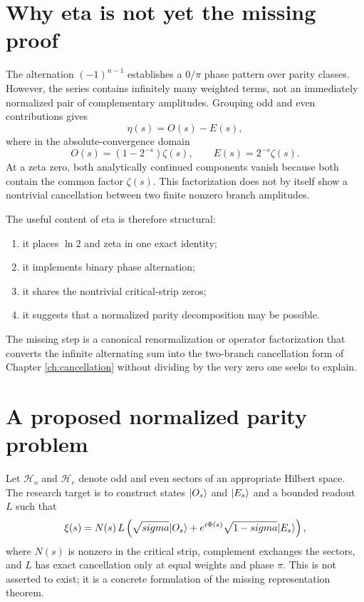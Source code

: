 \section{Why eta is not yet the missing proof}
The alternation $(-1)^{n-1}$ establishes a $0/\pi$ phase pattern over parity classes. However, the series contains infinitely many weighted terms, not an immediately normalized pair of complementary amplitudes. Grouping odd and even contributions gives
\begin{equation}
\eta(s)=O(s)-E(s),
\end{equation}
where in the absolute-convergence domain
\begin{equation}
O(s)=(1-2^{-s})\zeta(s),
\qquad
E(s)=2^{-s}\zeta(s).
\end{equation}
At a zeta zero, both analytically continued components vanish because both contain the common factor $\zeta(s)$. This factorization does not by itself show a nontrivial cancellation between two finite nonzero branch amplitudes.

The useful content of eta is therefore structural:
\begin{enumerate}
\item it places $\ln2$ and zeta in one exact identity;
\item it implements binary phase alternation;
\item it shares the nontrivial critical-strip zeros;
\item it suggests that a normalized parity decomposition may be possible.
\end{enumerate}
The missing step is a canonical renormalization or operator factorization that converts the infinite alternating sum into the two-branch cancellation form of Chapter \ref{ch:cancellation} without dividing by the very zero one seeks to explain.

\section{A proposed normalized parity problem}
Let $\mathcal H_o$ and $\mathcal H_e$ denote odd and even sectors of an appropriate Hilbert space. The research target is to construct states $\lvert O_s\rangle$ and $\lvert E_s\rangle$ and a bounded readout $L$ such that
\begin{equation}
\xi(s)=N(s)\,L\left(
\sqrt{sigma}\lvert O_s\rangle
+e^{i\Phi(s)}\sqrt{1-sigma}\lvert E_s\rangle
\right),
\end{equation}
where $N(s)$ is nonzero in the critical strip, complement exchanges the sectors, and $L$ has exact cancellation only at equal weights and phase $\pi$. This is not asserted to exist; it is a concrete formulation of the missing representation theorem.
